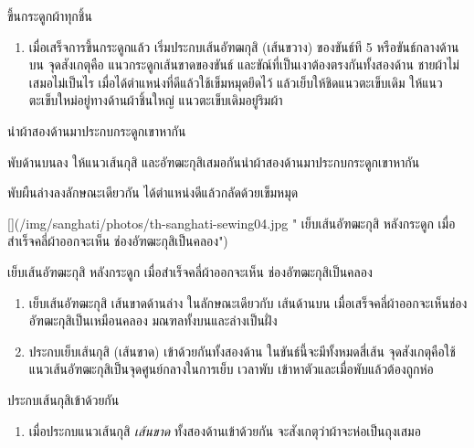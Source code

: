 
ขึ้นกระดูกผ้าทุกชิ้น

\begin{enumerate}
\def\labelenumi{(\arabic{enumi})}
\setcounter{enumi}{1}
\tightlist
\item
  เมื่อเสร็จการขึ้นกระดูกแล้ว เริ่มประกบเส้นอัฑฒกุสิ (เส้นขวาง)
  ของขันธ์ที 5 หรือขันธ์กลางด้านบน จุดสังเกตุคือ
  แนวกระดูกเส้นขาดของขันธ์ และขัณ์ที่เป็นเงาต้องตรงกันทั้งสองด้าน
  ชายผ้าไม่เสมอไม่เป็นไร เมื่อได้ตำแหน่งที่ดีแล้วใช้เข็มหมุดยึดไว้
  แล้วเย็บให้ชิดแนวตะเข็บเดิม ให้แนวตะเข็บใหม่อยู่ทางด้านผ้าชิ้นใหญ่
  แนวตะเข็บเดิมอยู่ริมผ้า
\end{enumerate}


นำผ้าสองด้านมาประกบกระดูกเขาหากัน


พับด้านบนลง ให้แนวเส้นกุสิ
และอัฑฒะกุสิเสมอกันนำผ้าสองด้านมาประกบกระดูกเขาหากัน


พับผืนล่างลงลักษณะเดียวกัน ได้ตำแหน่งดีแล้วกลัดด้วยเข็มหมุด

{[}{]}(/img/sanghati/photos/th-sanghati-sewing04.jpg " เย็บเส้นอัฑฒะกุสิ
หลังกระดูก เมื่อสำเร็จคลี่ผ้าออกจะเห็น ช่องอัฑฒะกุสิเป็นคลอง")

เย็บเส้นอัฑฒะกุสิ หลังกระดูก เมื่อสำเร็จคลี่ผ้าออกจะเห็น
ช่องอัฑฒะกุสิเป็นคลอง

\begin{enumerate}
\def\labelenumi{(\arabic{enumi})}
\setcounter{enumi}{2}
\item
  เย็บเส้นอัฑฒะกุสิ เส้นขาดด้านล่าง ในลักษณะเดียวกับ เส้นด้านบน
  เมื่อเสร็จคลี่ผ้าออกจะเห็นช่อง อัฑฒะกุสิเป็นเหมือนคลอง
  มณฑลทั้งบนและล่างเป็นฝั่ง
\item
  ประกบเย็บเส้นกุสิ (เส้นขาด) เข้าด้วยกันทั้งสองด้าน
  ในขันธ์นี้จะมีทั้งหมดสี่เส้น
  จุดสังเกตุคือใช้แนวเส้นอัฑฒะกุสิเป็นจุดศูนย์กลางในการเย็บ เวลาพับ
  เข้าหาตัวและเมื่อพับแล้วต้องถูกห่อ
\end{enumerate}


ประกบเส้นกุสิเข้าด้วยกัน

\begin{enumerate}
\def\labelenumi{(\arabic{enumi})}
\setcounter{enumi}{4}
\tightlist
\item
  เมื่อประกบแนวเส้นกุสิ \emph{เส้นขาด} ทั้งสองด้านเข้าด้วยกัน
  จะสังเกตุว่าผ้าจะห่อเป็นถุงเสมอ
\end{enumerate}

